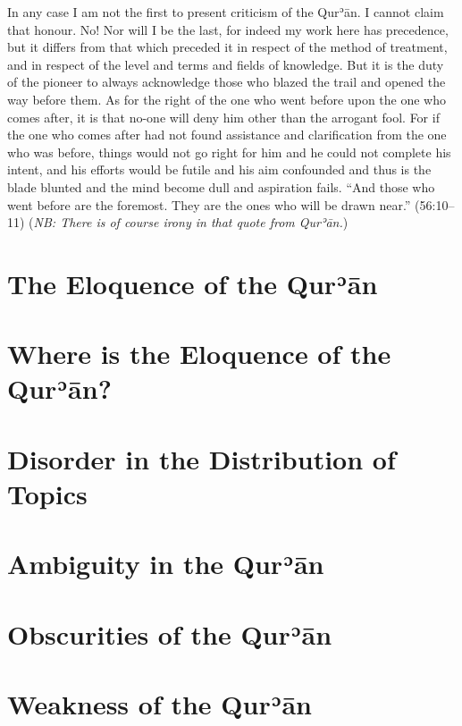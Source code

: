 \documentclass[12pt]{book}
\def \Quran{Qurʾān} %
\newcommand{\NB}[1]{\emph{\small NB: #1}}
\begin{document}

In any case I am not the first to present criticism of the \Quran.
I cannot claim that honour.
No! Nor will I be the last, for indeed my work here has precedence,
but it differs from that which preceded it in
respect of the method of treatment,
and in respect of the level and terms and fields of knowledge.
But it is the duty of the pioneer to always acknowledge those
who blazed the trail and opened the way before them.
As for the right of the one who went before upon the one who comes after,
it is that no-one will deny him other than the arrogant fool.
For if the one who comes after had not found assistance and
clarification from the one who was before,
things would not go right for him and he could not complete his intent,
and his efforts would be futile and his aim confounded and
thus is the blade blunted and the mind become dull and aspiration fails.
“And those who went before are the foremost.
They are the ones who will be drawn near.” (56:10–11)
(\NB{There is of course irony in that quote from \Quran.})

\section{The Eloquence of the \Quran}

\section{Where is the Eloquence of the \Quran?}

\section{Disorder in the Distribution of Topics}

\section{Ambiguity in the \Quran}

\section{Obscurities of the \Quran}

\section{Weakness of the \Quran}
\end{document}

